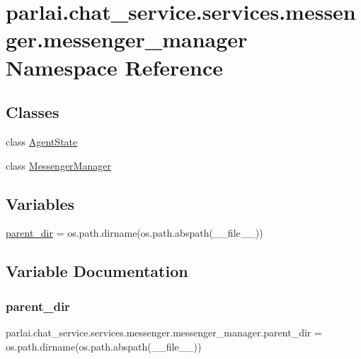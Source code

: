 \hypertarget{namespaceparlai_1_1chat__service_1_1services_1_1messenger_1_1messenger__manager}{}\section{parlai.\+chat\+\_\+service.\+services.\+messenger.\+messenger\+\_\+manager Namespace Reference}
\label{namespaceparlai_1_1chat__service_1_1services_1_1messenger_1_1messenger__manager}
\subsection*{Classes}
\begin{DoxyCompactItemize}
\item 
class \hyperlink{classparlai_1_1chat__service_1_1services_1_1messenger_1_1messenger__manager_1_1AgentState}{Agent\+State}
\item 
class \hyperlink{classparlai_1_1chat__service_1_1services_1_1messenger_1_1messenger__manager_1_1MessengerManager}{Messenger\+Manager}
\end{DoxyCompactItemize}
\subsection*{Variables}
\begin{DoxyCompactItemize}
\item 
\hyperlink{namespaceparlai_1_1chat__service_1_1services_1_1messenger_1_1messenger__manager_abfde7568d777b41aafdc401a1324c965}{parent\+\_\+dir} = os.\+path.\+dirname(os.\+path.\+abspath(\+\_\+\+\_\+file\+\_\+\+\_\+))
\end{DoxyCompactItemize}


\subsection{Variable Documentation}
\mbox{\label{namespaceparlai_1_1chat__service_1_1services_1_1messenger_1_1messenger__manager_abfde7568d777b41aafdc401a1324c965}} 
\subsubsection{\texorpdfstring{parent\+\_\+dir}{parent\_dir}}
{\footnotesize\ttfamily parlai.\+chat\+\_\+service.\+services.\+messenger.\+messenger\+\_\+manager.\+parent\+\_\+dir = os.\+path.\+dirname(os.\+path.\+abspath(\+\_\+\+\_\+file\+\_\+\+\_\+))}

